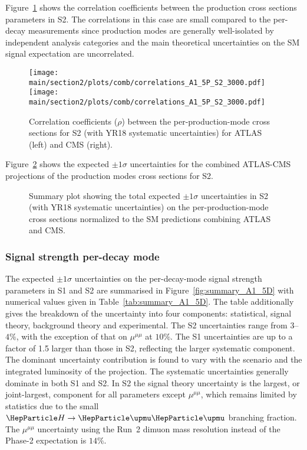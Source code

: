 Figure~\ref{fig:corr_A1_5P} shows the correlation coefficients between the production cross sections  parameters in S2. The correlations in this case are small compared to the per-decay measurements since production modes are generally well-isolated by independent analysis categories and the main theoretical uncertainties on the SM signal expectation are uncorrelated.

\begin{figure}[hbtp]
\centering
\texttt{[image: \\main/section2/plots/comb/correlations\_A1\_5P\_S2\_3000.pdf]}%
\texttt{[image: \\main/section2/plots/comb/correlations\_A1\_5P\_S2\_3000.pdf]}%
\caption{Correlation coefficients ($\rho$) between the per-production-mode cross sections for S2 (with YR18 systematic uncertainties) for  ATLAS (left) and CMS (right). }
\label{fig:corr_A1_5P}
\end{figure}

Figure~\ref{fig:comb_5P} shows the expected $\pm 1\sigma$ uncertainties for the combined ATLAS-CMS projections of the production modes cross sections for S2. 

\begin{figure}[hbtp]
\centering
\caption{Summary plot showing the total expected $\pm 1\sigma$ uncertainties in S2  (with YR18 systematic uncertainties) on the per-production-mode cross sections normalized to the SM predictions combining  ATLAS and CMS.}
\label{fig:comb_5P}
\end{figure}


\subsubsection{Signal strength per-decay mode}

The expected $\pm 1\sigma$ uncertainties on the per-decay-mode signal strength parameters in S1 and S2 are summarised in Figure~\ref{fig:summary_A1_5D} with numerical values given in Table~\ref{tab:summary_A1_5D}. The table additionally gives the breakdown of the uncertainty into four components: statistical, signal theory, background theory and experimental. The S2 uncertainties range from $3$--$4\%$, with the exception of that on $\mu^{\mu\mu}$ at $10\%$. The S1 uncertainties are up to a factor of 1.5 larger than those in S2, reflecting the larger systematic component. The dominant uncertainty contribution is found to vary with the scenario and the integrated luminosity of the projection. The systematic uncertainties generally dominate in both S1 and S2. In S2 the signal theory uncertainty is the largest, or joint-largest, component for all parameters except $\mu^{\mu\mu}$, which remains limited by statistics due to the small $\hmm$ branching fraction. The $\mu^{\mu\mu}$ uncertainty using the Run~2 dimuon mass resolution instead of the Phase-2 expectation is $14\%$.


